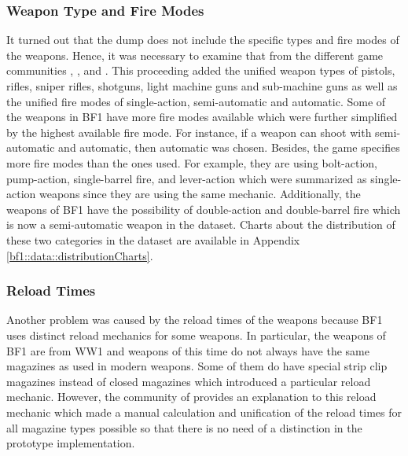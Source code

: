 \documentclass[MGS,Master,english]{twbook}%
\begin{document}
\subsubsection{Weapon Type and Fire Modes}
It turned out that the dump does not include the specific types and fire modes of the weapons. Hence, it was necessary to examine that from the different game communities \citep{symthic::bf1stats}, \citep{bf1::community1}, and \citep{bf1::community2}. This proceeding added the unified weapon types of pistols, rifles, sniper rifles, shotguns, light machine guns and sub-machine guns as well as the unified fire modes of single-action, semi-automatic and automatic. Some of the weapons in \ac{BF1} have more fire modes available which were further simplified by the highest available fire mode. For instance, if a weapon can shoot with semi-automatic and automatic, then automatic was chosen. Besides, the game specifies more fire modes than the ones used. For example, they are using bolt-action, pump-action, single-barrel fire, and lever-action which were summarized as single-action weapons since they are using the same mechanic. Additionally, the weapons of \ac{BF1} have the possibility of double-action and double-barrel fire which is now a semi-automatic weapon in the dataset. Charts about the distribution of these two categories in the dataset are available in Appendix \ref{bf1::data::distributionCharts}. 

\subsubsection{Reload Times}
Another problem was caused by the reload times of the weapons because \ac{BF1} uses distinct reload mechanics for some weapons. In particular, the weapons of \ac{BF1} are from \ac{WW1} and weapons of this time do not always have the same magazines as used in modern weapons. Some of them do have special strip clip magazines instead of closed magazines which introduced  a particular reload mechanic. However, the community of \citep{symthic::bf1stats} provides an explanation to this reload mechanic which made a manual calculation and unification of the reload times for all magazine types possible so that there is no need of a distinction in the prototype implementation.
\end{document}
